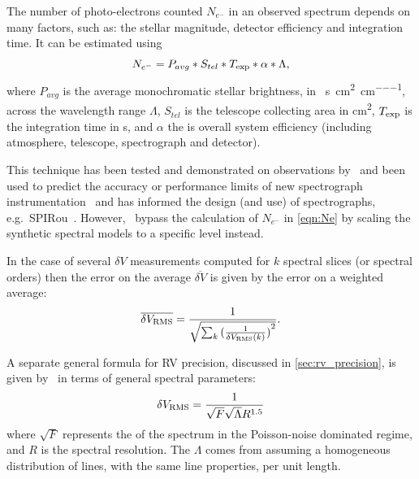 The number of photo-electrons counted \(N_{{e}^{-}}\) in an observed spectrum depends on many factors, such as: the stellar magnitude, detector efficiency and integration time.
It can be estimated using
\begin{equation}
N_{{e}^{-}} = P_{avg} * S_{tel} * T_{\textrm{exp}} * \alpha* \Lambda, \label{eqn:Ne}
\end{equation}
where \(P_{avg}\) is the average monochromatic stellar brightness, in {\si{\photons\per\second\per\centi\metre\squared\per\centi\metre}},
across the wavelength range \(\Lambda\),
\(S_{tel}\) is the telescope collecting area in \si{\centi\metre\squared},
\(T_{\textrm{exp}}\) is the integration time in \si{\second}, and \(\alpha\) the is overall system efficiency (including atmosphere, telescope, spectrograph and detector).

This technique has been tested and demonstrated on observations by~\citet{connes_demonstration_1996} and been used to predict the accuracy or performance limits of new spectrograph instrumentation~\citep[e.g.][]{connes_absolute_1985,butler_attaining_1996,bouchy_fundamental_2001} and has informed the design (and use) of spectrographs, e.g.\ {SPIRou}~\citep{artigau_spirou_2014,figueira_radial_2016}.
However,~\citet{figueira_radial_2016} bypass the calculation of \(N_{{e}^{-}}\) in \cref{eqn:Ne} by scaling the synthetic spectral models to a specific \snr{} level instead.

In the case of several \(\delta V\) measurements computed for \(k\) spectral slices (or spectral orders) then the error on the average \(\overline{\delta V}\) is given by the error on a weighted average:
\begin{equation}
\overline{\delta {V}_{\textrm{RMS}}} = \frac{1}{\sqrt{\sum_k{{(\frac{1}{\delta V_{\textrm{RMS}}(k)})}^{2}}}}. \label{eqn:weighted_average_error}
\end{equation}

A separate general formula for {RV} precision, discussed in \cref{sec:rv_precision}, is given by~\citet{hatzes_spectrograph_1992} in terms of general spectral parameters:
\begin{equation}
\delta V_{\textrm{RMS}} = \frac{1}{\sqrt{F} \sqrt{\Lambda} {R}^{1.5}}
\end{equation}
where $\sqrt{F}$ represents the \snr{} of the spectrum in the {Poisson}-noise dominated regime, and \(R\) is the spectral resolution.
The $\Lambda$ comes from assuming a homogeneous distribution of lines, with the same line properties, per unit length.
